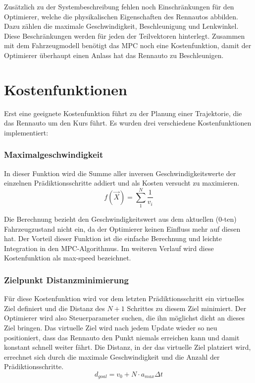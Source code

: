 \documentclass{like}
\begin{document}
Zusätzlich zu der Systembeschreibung fehlen noch Einschränkungen für den Optimierer, welche die physikalischen Eigenschaften des Rennautos abbilden.
Dazu zählen die maximale Geschwindigkeit, Beschleunigung und Lenkwinkel. 
Diese Beschränkungen werden für jeden der Teilvektoren hinterlegt. 
Zusammen mit dem Fahrzeugmodell benötigt das \ac{MPC} noch eine Kostenfunktion, damit der Optimierer überhaupt einen Anlass hat das Rennauto zu Beschleunigen.


\section{Kostenfunktionen}
\label{costFunctions}
Erst eine geeignete Kostenfunktion führt zu der Planung einer Trajektorie, die das Rennauto um den Kurs führt. Es wurden drei verschiedene Kostenfunktionen implementiert:

\subsubsection*{Maximalgeschwindigkeit}  
In dieser Funktion wird die Summe aller inversen Geschwindigkeitswerte der einzelnen Prädiktionsschritte addiert und als Kosten versucht zu maximieren. \\
\begin{equation}
	f(\vec{X}) =  \sum_{1}^{N} \frac{1}{v_i}
\end{equation}

Die Berechnung bezieht den Geschwindigkeitswert aus dem aktuellen (0-ten) Fahrzeugzustand nicht ein, da der Optimierer keinen Einfluss mehr auf diesen hat. Der Vorteil dieser Funktion ist die einfache Berechnung und leichte Integration in den \ac{MPC}-Algorithmus. Im weiteren Verlauf wird diese Kostenfunktion als max-speed bezeichnet.

\subsubsection*{Zielpunkt Distanzminimierung}
Für diese Kostenfunktion wird vor dem letzten Prädiktionsschritt ein virtuelles Ziel definiert und die Distanz des $N+1$ Schrittes zu diesem Ziel minimiert. Der Optimierer wird also Steuerparameter suchen, die ihn möglichst dicht an dieses Ziel bringen. Das virtuelle Ziel wird nach jedem Update wieder so neu positioniert, dass das Rennauto den Punkt niemals erreichen kann und damit konstant schnell weiter fährt. Die Distanz, in der das virtuelle Ziel platziert wird, errechnet sich durch die maximale Geschwindigkeit und die Anzahl der Prädiktionsschritte. 
\begin{equation}
	d_{goal} = v_0 + N \cdot a_{max}  \Delta t
\end{equation}
\end{document}
